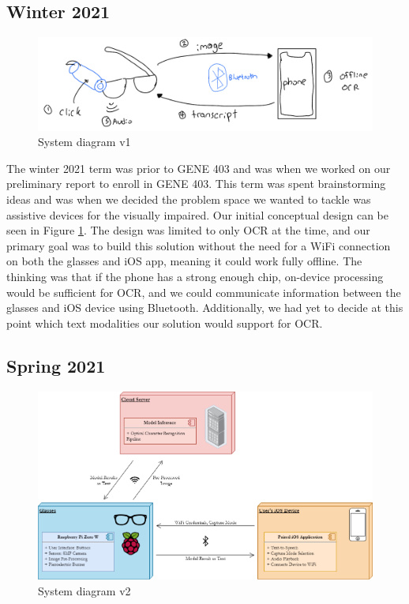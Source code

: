 \documentclass[a4paper,11pt]{article}
\begin{document}
\subsection{Winter 2021}
\label{winter-2021-design}
\begin{figure}[H]
\centering
\includegraphics[scale=0.265]{img/system_diagrams/system_diagram_v1.jpeg}
\caption{System diagram v1}
\label{fig:system_diagram_v1}
\end{figure}
The winter 2021 term was prior to GENE 403 and was when we worked on our preliminary report to enroll in GENE 403. This term was spent brainstorming ideas and was when we decided the problem space we wanted to tackle was assistive devices for the visually impaired. Our initial conceptual design can be seen in Figure \ref{fig:system_diagram_v1}. The design was limited to only OCR at the time, and our primary goal was to build this solution without the need for a WiFi connection on both the glasses and iOS app, meaning it could work fully offline. The thinking was that if the phone has a strong enough chip, on-device processing would be sufficient for OCR, and we could communicate information between the glasses and iOS device using Bluetooth. Additionally, we had yet to decide at this point which text modalities our solution would support for OCR.

\subsection{Spring 2021}
\label{spirng-2021-design}
\begin{figure}[H]
\centering
\includegraphics[scale=0.4]{img/system_diagrams/system_diagram_v2.png}
\caption{System diagram v2}
\label{fig:system_diagram_v2}
\end{figure}
\end{document}
